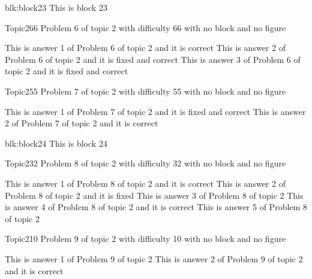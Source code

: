 \documentclass[master]{exam}
\begin{document}
\begin{block}{blk:block23}
This is block 23
\end{block}


\begin{problem}{Topic2}{66}
	Problem 6 of topic 2 with difficulty 66 with no block and no figure
	\begin{answers}
		\answer[correct] This is answer 1 of Problem 6 of topic 2 and it is correct
		 This is answer 2 of Problem 6 of topic 2 and it is fixed and correct
		 This is answer 3 of Problem 6 of topic 2 and it is fixed and correct
	\end{answers}
\end{problem}

\begin{problem}{Topic2}{55}
	Problem 7 of topic 2 with difficulty 55 with no block and no figure
	\begin{answers}
		 This is answer 1 of Problem 7 of topic 2 and it is fixed and correct
		\answer[correct] This is answer 2 of Problem 7 of topic 2 and it is correct
	\end{answers}
\end{problem}



\begin{block}{blk:block24}
This is block 24
\end{block}


\begin{problem}{Topic2}{32}
	Problem 8 of topic 2 with difficulty 32 with no block and no figure
	\begin{answers}
		\answer[correct] This is answer 1 of Problem 8 of topic 2 and it is correct
		\answer[fixed] This is answer 2 of Problem 8 of topic 2 and it is fixed
		\answer This is answer 3 of Problem 8 of topic 2 
		\answer[correct] This is answer 4 of Problem 8 of topic 2 and it is correct
		\answer This is answer 5 of Problem 8 of topic 2 
	\end{answers}
\end{problem}

\begin{problem}{Topic2}{10}
	Problem 9 of topic 2 with difficulty 10 with no block and no figure
	\begin{answers}
		\answer This is answer 1 of Problem 9 of topic 2 
		\answer[correct] This is answer 2 of Problem 9 of topic 2 and it is correct
	\end{answers}
\end{problem}
\end{document}
